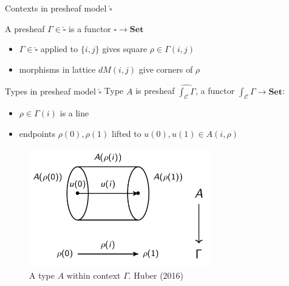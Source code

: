 \documentclass[english,draft]{beamer}
\newcommand{\incfig}[1]{%
    \def\svgwidth{\columnwidth}
    {#1.pdf_tex}
}
\begin{document}
\begin{frame}{Contexts in presheaf model $\widehat{\square}$}
 

    \begin{example}
        A presheaf $\Gamma \in \widehat{\square}$ is a functor $\square \rightarrow \mathbf{Set}$

        \begin{itemize}
            \item $\Gamma \in \widehat{\square}$ applied to $\{i,j\}$ gives square $\rho \in \Gamma (i,j)$
            \item morphisms in lattice $dM(i,j)$ give corners of $\rho$

        \end{itemize}
        \begin{figure}
            
            
        \end{figure}
    \end{example}
 
\end{frame}

\begin{frame}{Types in presheaf model $\widehat{\square}$}
    Type $A$ is presheaf $\widehat{\int_{\mathcal{C}} \Gamma}$, a functor $\int_{\mathcal{C}} \Gamma \rightarrow \mathbf{Set}$:

    \begin{itemize}
        \item $\rho \in \Gamma (i)$ is a line
        \item endpoints $\rho (0), \rho (1)$ lifted to $u(0),u(1) \in A(i,\rho)$
    \end{itemize}

 \begin{figure}
\centering
\includegraphics[width=0.7\textwidth]{figures/types}
\caption{A type $A$ within context $\Gamma$. Huber (2016)}
 \end{figure}
 
\end{frame}
\end{document}
